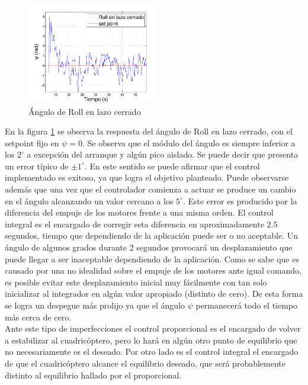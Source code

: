 \documentclass[main]{subfiles}
\begin{document}
\begin{figure}
	\vspace{-10pt}
	\centering
	\includegraphics[width=0.52\textwidth]{./pics_test_control/psi.pdf}
	\caption{\'Angulo de Roll en lazo cerrado}
	\label{fig:psi}
\end{figure}
\vspace{10pt}
En la figura \ref{fig:psi} se observa la respuesta del \'angulo de Roll en lazo cerrado, con el setpoint fijo en $\psi = 0$. Se observa que el m\'odulo del \'angulo es siempre inferior a los $2^\circ$ a excepci\'on del arranque y algún pico aislado. Se puede decir que presenta un error típico de $\pm 1^\circ$. En este sentido se puede afirmar que el control implementado es exitoso, ya que logra el objetivo planteado. Puede observarse adem\'as que una vez que el controlador comienza a actuar se produce un cambio en el \'angulo alcanzando un valor cercano a los $5 ^\circ$. Este error es producido por la diferencia del empuje de los motores frente a una misma orden. El control integral es el encargado de corregir esta diferencia en aproximadamente $2.5$ segundos, tiempo que dependiendo de la aplicación puede ser o no aceptable. Un ángulo de algunos grados durante 2 segundos provocará un desplazamiento que puede llegar a ser inaceptable dependiendo de la aplicación. Como se sabe que es causado por una no idealidad sobre el empuje de los motores ante igual comando, es posible evitar este desplazamiento inicial muy fácilmente con tan solo inicializar al integrador en algún valor apropiado (distinto de cero). De esta forma se logra un despegue más prolijo ya que el ángulo $\psi$ permanecerá todo el tiempo más cerca de cero.\\

Ante este tipo de imperfecciones el control proporcional es el encargado de volver a estabilizar al cuadricóptero, pero lo hará en algún otro punto de equilibrio que no necesariamente es el deseado. Por otro lado es el control integral el encargado de que el cuadricóptero alcance el equilibrio deseado, que será probablemente distinto al equilibrio hallado por el proporcional.\\
\end{document}
